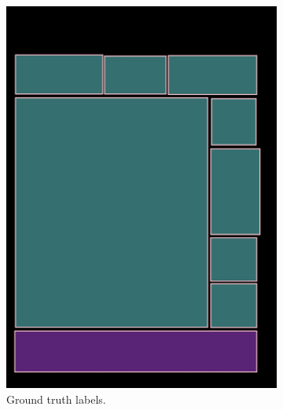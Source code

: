 \documentclass[oneside, english, bibtex]{kththesis}
\begin{document}
\begin{figure}[!htb]
\begin{adjustbox}{center,max size={\textwidth}{0.9\textheight}}
{\begin{subfigure}{0.6\textwidth}
  \includegraphics[width=\linewidth, clip=true, trim = 0mm 0mm 0mm 0mm]{figures/bbox/JIefsDa.jpg}
  \caption{Ground truth labels.}
  \label{fig:JIefsDa_GT}
\end{subfigure}
  \centering
\begin{subfigure}{0.6\textwidth}
  \centering

\end{subfigure}}
\end{adjustbox}
\end{figure}
\end{document}
